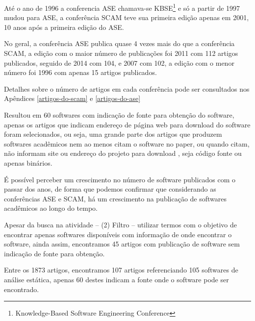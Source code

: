 Até o ano de 1996 a conferencia ASE chamava-se KBSE\footnote{ Knowledge-Based
Software Engineering Conference} e só a partir de 1997 mudou para ASE, a
conferência SCAM teve sua primeira edição apenas em 2001, 10 anos após a
primeira edição do ASE.

No geral, a conferência ASE publica quase 4 vezes mais do que a conferência
SCAM, a edição com o maior número de publicações foi 2011 com 112 artigos
publicados, seguido de 2014 com 104, e 2007 com 102, a edição com o menor
número foi 1996 com apenas 15 artigos publicados.

Detalhes sobre o número de artigos
em cada conferência pode ser consultados nos Apêndices
\ref{artigos-do-scam} e \ref{artigos-do-ase} 



Resultou em 60 softwares com indicação de fonte para obtenção do
software, apenas os artigos que indicam endereço de página web para download do
software foram selecionados, ou seja, uma grande parte dos artigos que produzem
softwares acadêmicos nem ao menos citam o software no paper, ou quando citam,
não informam site ou endereço do projeto para download
\cite{allen2017engineering}, seja código fonte ou apenas binários.


É possível perceber um crescimento no número de software publicados com o
passar dos anos, de forma que podemos confirmar que considerando as
conferências ASE e SCAM, há um crescimento na publicação de softwares
acadêmicos ao longo do tempo.

Apesar da busca na atividade -- (2) Filtro -- utilizar termos com o objetivo de
encontrar apenas softwares disponíveis com informação de onde encontrar o
software, ainda assim, encontramos 45 artigos com publicação de software sem
indicação de fonte para obtenção.

Entre os 1873 artigos, encontramos 107 artigos referenciando 105 softwares de
análise estática, apenas 60 destes indicam a fonte onde o software pode ser
encontrado.


